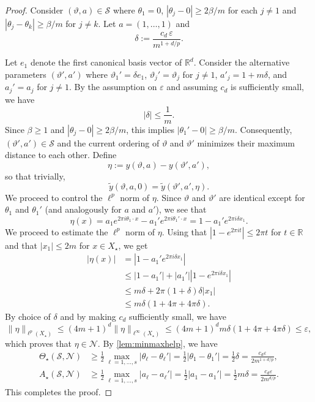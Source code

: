 \documentclass[11pt]{article}
\theoremstyle{definition}
\numberwithin{theorem}{section}
\numberwithin{lemma}{section}
\numberwithin{equation}{section}
\def\R{\mathbb{R}}
\renewcommand{\tilde}{\widetilde}
\renewcommand{\epsilon}{\varepsilon}
\newcommand{\bfa}{a}
\newcommand{\calS}{\mathcal{S}}
\newcommand{\calN}{\mathcal{N}}
\numberwithin{equation}{section}
\begin{document}
	\begin{proof}
	Consider $(\vartheta,\bfa)\in \calS$ where $\theta_1=0$, $|\theta_j-0|\geq 2\beta/m$ for each $j\ne 1$ and $|\theta_j-\theta_k|\geq \beta/m$ for $j\ne k$. Let $a=(1,\dots,1)$ and
	$$
	\delta:=\frac {c_d\, \epsilon} {m^{1+d/p}}.
	$$
	
	Let $e_1$ denote the first canonical basis vector of $\R^d$. Consider the alternative parameters $(\vartheta',\bfa')$ where $\vartheta_1'=\delta e_1$, $\vartheta_j'=\vartheta_j$ for $j\ne 1$, $a'_j = 1+m \delta$, and $a_j'=a_j$ for $j\ne1$. By the assumption on $\epsilon$ and assuming $c_{d}$ is sufficiently small, we have 
	$$
	|\delta|\leq \frac 1 m. 
	$$
	Since $\beta \geq 1$ and $|\theta_j-0|\geq 2\beta/m$, this implies $|\theta_1'-0|\geq \beta/m$. Consequently, $(\vartheta',\bfa')\in \calS$ and the current ordering of $\vartheta$ and $\vartheta'$ minimizes their maximum distance to each other. Define 
	$$
	\eta:= y(\vartheta,a)-y(\vartheta',a'), 
	$$
	so that trivially, 
	$$
	\tilde y(\vartheta,a,0) = \tilde y(\vartheta',a',\eta). 
	$$
	We proceed to control the $\ell^p$ norm of $\eta$. Since $\vartheta$ and $\vartheta'$ are identical except for $\theta_1$ and $\theta_1'$ (and analogously for $a$ and $a'$), we see that 
	$$
	\eta(x) = a_1 e^{2\pi i\theta_1\cdot x} - a_1' e^{2\pi i \theta_1'\cdot x} = 1 - a_1' e^{2\pi i \delta x_1}.
	$$
	We proceed to estimate the $\ell^p$ norm of $\eta$. Using that $|1-e^{2\pi it}|\leq 2\pi t$ for $t\in \R$ and that $|x_1|\leq 2m$ for $x\in X_\star$, we get
	\begin{align*}
		|\eta(x)| 
		&= |1 - a_1'  e^{2\pi i \delta x_1}| \\
		&\leq |1-a_1'| + |a_1'| |1- e^{2\pi i \delta x_1} | \\
		&\leq m \delta + 2\pi (1+\delta) \delta |x_1| \\
		&\leq m \delta (1+4\pi + 4\pi \delta).
	\end{align*}
	By choice of $\delta$ and by making $c_d$ sufficiently small, we have
	$$
	\|\eta\|_{\ell^p(X_\star)}
	\leq (4m+1)^d \|\eta\|_{\ell^\infty(X_\star)}
	\leq (4m+1)^d  m \delta (1+4\pi + 4\pi \delta)
	\leq \epsilon,
	$$
	which proves that $\eta\in \calN$. By \cref{lem:minmaxhelp}, we have 
	\begin{align*}
		\Theta_\star(\calS,\calN)
		&\geq \frac 12 \max_{\ell=1,\dots,s}|\theta_\ell-\theta_\ell'|
		=\frac 12 |\theta_1-\theta_1'|
		=\frac 12\delta 
		=\frac{c_d \epsilon}{2m^{1+d/p}}, \\
		A_\star(\calS,\calN)
		&\geq \frac 12 \max_{\ell=1,\dots,s} |a_\ell-a_\ell'|
		=\frac 12 |a_1-a_1'|
		=\frac 12 m\delta
		=\frac{c_d \epsilon}{2m^{d/p}}. 
	\end{align*}
	This completes the proof.
	\end{proof}
	
\end{document}
